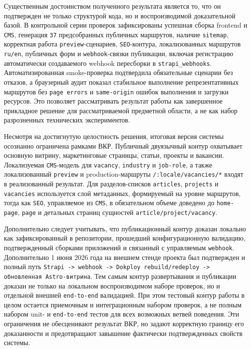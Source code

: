 Существенным достоинством полученного результата является то, что он подтвержден не только
структурой кода, но и воспроизводимой доказательной базой. В контрольной серии проверок
зафиксированы успешная сборка frontend и \texttt{CMS}, генерация \texttt{37}
предсобранных публичных маршрутов, наличие \texttt{sitemap}, корректная работа
\texttt{preview}-сценариев, \texttt{SEO}-контура, локализованных маршрутов
\texttt{ru/en}, публичных форм и \texttt{webhook}-связки публикации, включая
регистрацию автоматически создаваемого webhook пересборки в \texttt{strapi\_webhooks}. Автоматизированная
smoke-проверка подтвердила обязательные сценарии без отказов, а браузерный аудит показал
стабильное выполнение репрезентативных маршрутов без \texttt{page errors} и
\texttt{same-origin} ошибок выполнения и загрузки ресурсов. Это позволяет
рассматривать результат работы как завершенное прикладное решение для рассматриваемой
предметной области, а не как набор разрозненных технических экспериментов.


Несмотря на достигнутую целостность решения, итоговая версия системы осознанно ограничена
рамками ВКР. Публичный двуязычный контур охватывает основную витрину,
маркетинговые страницы, статьи, проекты и вакансии. Локализуемая \texttt{CMS}-модель для
\texttt{vacancy}, \texttt{industry} и \texttt{job-role}, а также локализованный
\texttt{preview} и production-маршруты \texttt{/:locale/vacancies/*} входят в
реализованный результат. Для разделов-списков
\texttt{articles}, \texttt{projects} и \texttt{vacancies} используется слой метаданных,
формируемый на уровне маршрутов, тогда как \texttt{SEO}, управляемое из \texttt{CMS}, в
обязательном объеме доведено до \texttt{home-page}, \texttt{page} и детальных страниц
сущностей \texttt{article/project/vacancy}.

Дополнительно следует учитывать, что публикационный контур доказан локально как
зафиксированный в репозитории, прошедший конфигурационную валидацию, подтвержденный
сборками приложений и связанный с управляемым \texttt{webhook}. Дополнительно 1 июня 2026
года на внешнем стенде проекта был подтвержден и полный путь
\texttt{Strapi -> webhook -> Dokploy rebuild/redeploy -> обновленная Astro-витрина}. Тем
самым контур развертывания и публикации доказан не только на локальном воспроизводимом
наборе проверок, но и
отдельной внешней \texttt{end-to-end} валидацией. При этом тестовый контур работы в целом
остается приемочным и интеграционным набором проверок, а не полным набором unit- и
\texttt{end-to-end} тестов для всех возможных ветвей поведения. Эти ограничения не
обесценивают результат ВКР, но задают корректную границу его доказанности и предотвращают
завышение фактически подтвержденных свойств системы.

